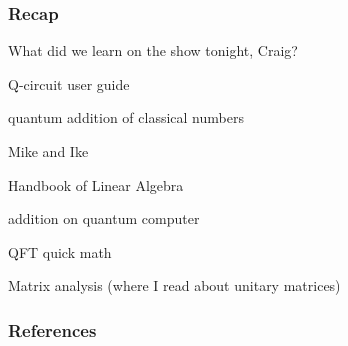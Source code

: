 \documentclass{beamer}
\theoremstyle{definition}
\begin{document}
\begin{frame}
\frametitle{Recap}
What did we learn on the show tonight, Craig? 

Q-circuit user guide \cite{eastin2004q}

quantum addition of classical numbers \cite{cherkas2016quantum}


Mike and Ike \cite{nielsen2002quantum}

Handbook of Linear Algebra \cite{hogben2006handbook}

addition on quantum computer \cite{draper2000q}

QFT quick math \cite{baconQFT}

Matrix analysis (where I read about unitary matrices) \cite{horn1990matrix}

\end{frame}

\begin{frame}
\frametitle{References}


{}



\end{frame}



 
\end{document}
